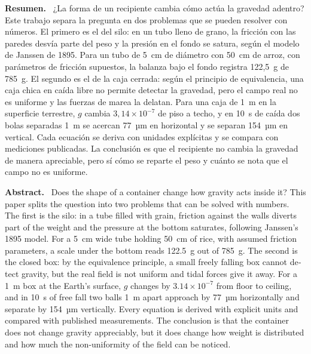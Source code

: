 \documentclass[11pt,a4paper]{article}
\title{\titulo}
\author{Bruno Loiacono\\[2pt]\small Estudiante de Física, Universidad de Buenos Aires}
\date{Noviembre de 2026\\[8pt]\fbox{\small Preprint, documento de trabajo sin revisión por pares}}
\newenvironment{resumen}{\par\noindent\small\textbf{Resumen.}\ }{\par\medskip}
\newenvironment{abstractEN}{\par\noindent\small\begin{otherlanguage}{english}\textbf{Abstract.}\ }{\end{otherlanguage}\par\medskip}
\begin{document}
\maketitle
\thispagestyle{fancy}

\begin{resumen}
¿La forma de un recipiente cambia cómo actúa la gravedad adentro? Este trabajo separa la pregunta en dos problemas que se pueden resolver con números. El primero es el del silo: en un tubo lleno de grano, la fricción con las paredes desvía parte del peso y la presión en el fondo se satura, según el modelo de Janssen de 1895. Para un tubo de 5~cm de diámetro con 50~cm de arroz, con parámetros de fricción supuestos, la balanza bajo el fondo registra 122,5~g de 785~g. El segundo es el de la caja cerrada: según el principio de equivalencia, una caja chica en caída libre no permite detectar la gravedad, pero el campo real no es uniforme y las fuerzas de marea la delatan. Para una caja de 1~m en la superficie terrestre, $g$ cambia $3{,}14\times10^{-7}$ de piso a techo, y en 10~s de caída dos bolas separadas 1~m se acercan 77~µm en horizontal y se separan 154~µm en vertical. Cada ecuación se deriva con unidades explícitas y se compara con mediciones publicadas. La conclusión es que el recipiente no cambia la gravedad de manera apreciable, pero sí cómo se reparte el peso y cuánto se nota que el campo no es uniforme.
\end{resumen}

\begin{abstractEN}
Does the shape of a container change how gravity acts inside it? This paper splits the question into two problems that can be solved with numbers. The first is the silo: in a tube filled with grain, friction against the walls diverts part of the weight and the pressure at the bottom saturates, following Janssen's 1895 model. For a 5~cm wide tube holding 50~cm of rice, with assumed friction parameters, a scale under the bottom reads 122.5~g out of 785~g. The second is the closed box: by the equivalence principle, a small freely falling box cannot detect gravity, but the real field is not uniform and tidal forces give it away. For a 1~m box at the Earth's surface, $g$ changes by $3.14\times10^{-7}$ from floor to ceiling, and in 10~s of free fall two balls 1~m apart approach by 77~µm horizontally and separate by 154~µm vertically. Every equation is derived with explicit units and compared with published measurements. The conclusion is that the container does not change gravity appreciably, but it does change how weight is distributed and how much the non-uniformity of the field can be noticed.
\end{abstractEN}
\end{document}
